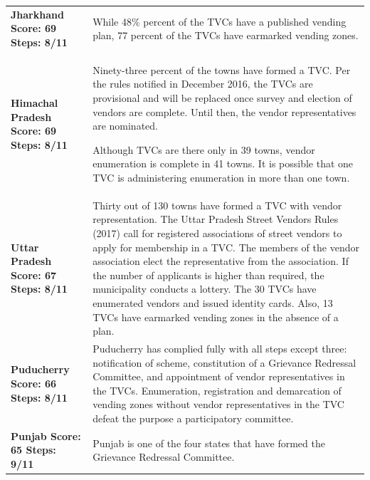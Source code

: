 \documentclass[a4paper, 12pt, twoside]{article}
\begin{document}
{\begin{longtable}[l]{>{\raggedright}p{4cm}>{\raggedright\arraybackslash}p{10cm}}
\\
\midrule
\multicolumn{2}{l}{States with Good Compliance (Index score Between 50 to 70)}\\
\midrule
\cellcolor{SVACgreen3}\bf{Jharkhand}
\newline
\bf{Score: 69}
\newline
\bf{Steps: 8/11}
&
\cellcolor{SVACgreen2}While 48\% percent of the TVCs have a published vending plan, 77 percent of the TVCs have earmarked vending zones.
\\
\cellcolor{SVACgreen3}\bf{Himachal Pradesh}
\newline
\bf{Score: 69}
\newline
\bf{Steps: 8/11}
&
\cellcolor{SVACgreen2}Ninety-three percent of the towns have formed a TVC. Per the rules notified in December 2016, the TVCs are provisional and will be replaced once survey and election of vendors are complete. Until then, the vendor representatives are nominated.

Although TVCs are there only in 39 towns, vendor enumeration is complete in 41 towns. It is possible that one TVC is administering enumeration in more than one town.
\\
\cellcolor{SVACgreen3}\bf{Uttar Pradesh}
\newline
\bf{Score: 67}
\newline
\bf{Steps: 8/11}
&
\cellcolor{SVACgreen2}Thirty out of 130 towns have formed a TVC with vendor representation. The Uttar Pradesh Street Vendors Rules (2017) call for registered associations of street vendors to apply for membership in a TVC. The members of the vendor association elect the representative from the association. If the number of applicants is higher than required, the municipality conducts a lottery. The 30 TVCs have enumerated vendors and issued identity cards. Also, 13 TVCs have earmarked vending zones in the absence of a plan.
\\
\cellcolor{SVACgreen3}\bf{Puducherry}
\newline
\bf{Score: 66}
\newline
\bf{Steps: 8/11}
&
\cellcolor{SVACgreen2}Puducherry has complied fully with all steps except three: notification of scheme, constitution of a Grievance Redressal Committee, and appointment of vendor representatives in the TVCs. Enumeration, registration and demarcation of vending zones without vendor representatives in the TVC defeat the purpose a participatory committee.
\\
\cellcolor{SVACgreen3}\bf{Punjab}
\newline
\bf{Score: 65}
\newline
\bf{Steps: 9/11}
&
\cellcolor{SVACgreen2}Punjab is one of the four states that have formed the Grievance Redressal Committee.


\end{longtable}}
\end{document}

